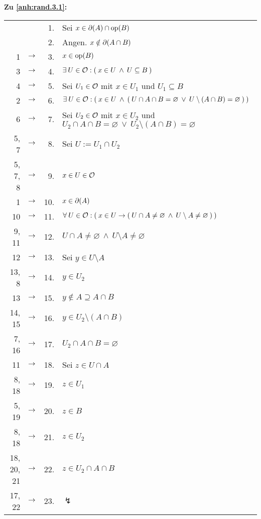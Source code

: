     \noindent
    \textbf{Zu \ref{anh:rand.3.1}: }
        \begin{longtable}{r c r l}
                    &          &  1. & Sei $x \in \partial(A) \cap \text{op}(B)$ \\
                    &          &  2. & Angen. $x \notin \partial(A \cap B)$ \\
            1          & $\rightarrow$ &  3. & $x \in \text{op}(B)$ \\
            3          & $\rightarrow$ &  4. & $\exists\: U \in \mathcal{O}: (\: x \in U \:\land\: U \subseteq B \:) $ \\
            4          & $\rightarrow$ &  5. & Sei $U_1 \in \mathcal{O}$ mit $x \in U_1$ und $U_1 \subseteq B$ \\
            2          & $\rightarrow$ &  6. & $\exists\: U \in \mathcal{O}: (\: x \in U \:\land\: (\: U \cap A \cap B = \varnothing \:\lor\: U \setminus (A \cap B) = \varnothing \:) \:)$ \\
            6          & $\rightarrow$ &  7. & Sei $U_2 \in \mathcal{O}$ mit $x \in U_2$ und $U_2 \cap A \cap B = \varnothing \:\lor\: U_2 \setminus (A \cap B) = \varnothing$ \\
            5, 7       & $\rightarrow$ &  8. & Sei $U := U_1 \cap U_2$ \\
            5, 7, 8    & $\rightarrow$ &  9. & $x \in U \in \mathcal{O}$ \\
            1          & $\rightarrow$ & 10. & $x \in \partial(A)$ \\
            10         & $\rightarrow$ & 11. & $\forall\: U \in \mathcal{O}: (\: x \in U \to (\: U \cap A \neq \varnothing \:\land\: U \setminus A \neq \varnothing \:) \:) $ \\
            9, 11      & $\rightarrow$ & 12. & $U \cap A \neq \varnothing \:\land\: U \setminus A \neq \varnothing$ \\
            12         & $\rightarrow$ & 13. & Sei $y \in U \setminus A$ \\
            13, 8      & $\rightarrow$ & 14. & $y \in U_2$ \\
            13         & $\rightarrow$ & 15. & $y \notin A \supseteq A \cap B$ \\
            14, 15     & $\rightarrow$ & 16. & $y \in U_2 \setminus (A \cap B)$ \\
            7, 16      & $\rightarrow$ & 17. & $U_2 \cap A \cap B = \varnothing$ \\
            11         & $\rightarrow$ & 18. & Sei $z \in U \cap A$ \\
            8, 18      & $\rightarrow$ & 19. & $z \in U_1$ \\
            5, 19      & $\rightarrow$ & 20. & $z \in B$ \\
            8, 18      & $\rightarrow$ & 21. & $z \in U_2$ \\
            18, 20, 21 & $\rightarrow$ & 22. & $z \in U_2 \cap A \cap B$ \\
            17, 22     & $\rightarrow$ & 23. & $\lightning$
        \end{longtable}

